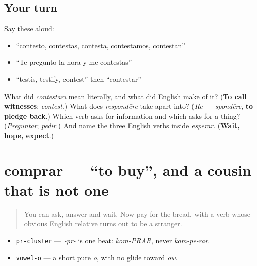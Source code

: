\subsection*{Your turn}
Say these aloud:

\begin{itemize}
\raggedright
  \item \textquotedblleft{}contesto, contestas, contesta, contestamos, contestan\textquotedblright{}
  \item \textquotedblleft{}Te pregunto la hora y me contestas\textquotedblright{}
  \item \textquotedblleft{}testis, testify, contest\textquotedblright{} then \textquotedblleft{}contestar\textquotedblright{}
\end{itemize}

\begin{tcolorbox}[breakable,colback=teal!4,colframe=teal!35!black,title={Before you move on}]
What did \emph{contestārī} mean literally, and what did English make of it? (\textbf{To call witnesses}; \emph{contest}.) What does \emph{respondēre} take apart into? (\emph{Re-} + \emph{spondēre}, \textbf{to pledge back}.) Which verb asks for information and which asks for a thing? (\emph{Preguntar}; \emph{pedir}.) And name the three English verbs inside \emph{esperar}. (\textbf{Wait, hope, expect}.)
\end{tcolorbox}
\section[comprar]{comprar — \textquotedblleft{}to buy\textquotedblright{}, and a cousin that is not one}

\label{lesson:ES-C40-comprar}



\begin{quote}
You can ask, answer and wait. Now pay for the bread, with a verb whose obvious English relative turns out to be a stranger.
\end{quote}

\begin{sounds}
\begin{itemize}
\raggedright
  \item \texttt{pr-cluster} — \emph{-pr-} is one beat: \emph{kom-PRAR}, never \emph{kom-pe-rar}.
  \item \texttt{vowel-o} — a short pure \emph{o}, with no glide toward \emph{ow}.
\end{itemize}
\end{sounds}

